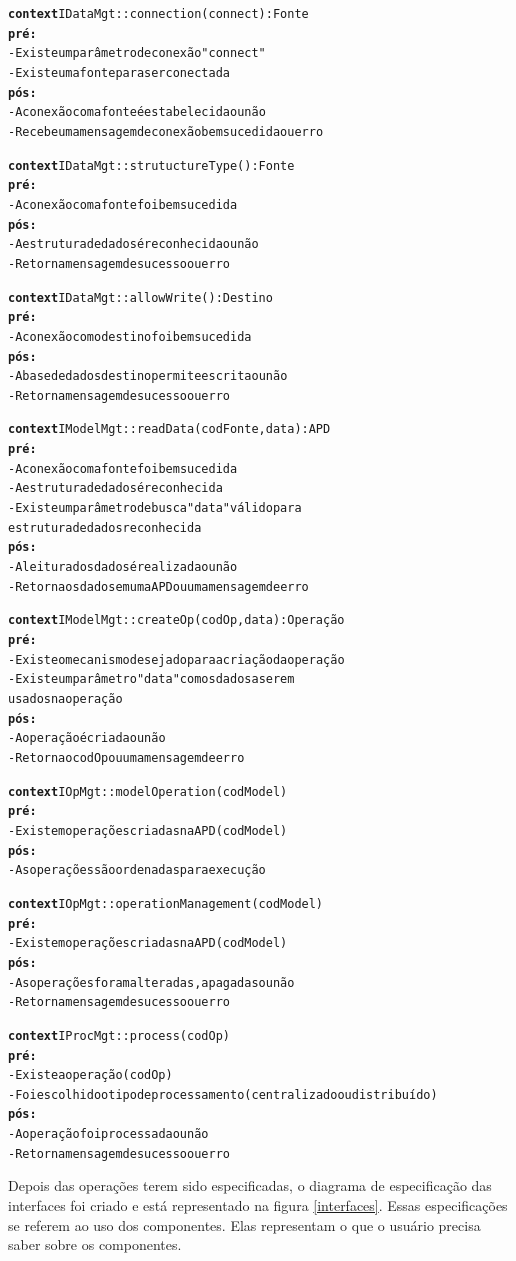 \begin{alltt}
	
	\textbf{context} IDataMgt :: connection(connect):Fonte
		\textbf{pré:}
		- Existe um parâmetro de conexão "connect"
		- Existe uma fonte para ser conectada
		\textbf{pós:}
		- A conexão com a fonte é estabelecida ou não
		- Recebe uma mensagem de conexão bem sucedida ou erro

	\textbf{context} IDataMgt :: strutuctureType():Fonte
		\textbf{pré:}
		- A conexão com a fonte foi bem sucedida
		\textbf{pós:}
		- A estrutura de dados é reconhecida ou não
		- Retorna mensagem de sucesso ou erro
		
	\textbf{context} IDataMgt :: allowWrite():Destino
		\textbf{pré:}
		- A conexão com o destino foi bem sucedida
		\textbf{pós:}
		- A base de dados destino permite escrita ou não
		- Retorna mensagem de sucesso ou erro
	
	\textbf{context} IModelMgt :: readData(codFonte, data):APD
		\textbf{pré:}
		- A conexão com a fonte foi bem sucedida
		- A estrutura de dados é reconhecida
		- Existe um parâmetro de busca "data" válido para 
		estrutura de dados reconhecida
		\textbf{pós:}
		- A leitura dos dados é realizada ou não
		- Retorna os dados em uma APD ou uma mensagem de erro
		
	\textbf{context} IModelMgt :: createOp(codOp, data):Operação
		\textbf{pré:}
		- Existe o mecanismo desejado para a criação da operação
		- Existe um parâmetro "data" com os dados a serem 
		usados na operação
		\textbf{pós:}
		- A operação é criada ou não
		- Retorna o codOp ou uma mensagem de erro
		
	\textbf{context} IOpMgt :: modelOperation(codModel)
		\textbf{pré:}
		- Existem operações criadas na APD (codModel)
		\textbf{pós:}
		- As operações são ordenadas para execução
		
	\textbf{context} IOpMgt :: operationManagement(codModel)
		\textbf{pré:}
		- Existem operações criadas na APD (codModel)
		\textbf{pós:}
		- As operações foram alteradas, apagadas ou não
		- Retorna mensagem de sucesso ou erro
	
	\textbf{context} IProcMgt :: process(codOp)
		\textbf{pré:}
		- Existe a operação (codOp)
		- Foi escolhido o tipo de processamento (centralizado ou distribuído)
		\textbf{pós:}
		- A operação foi processada ou não
		- Retorna mensagem de sucesso ou erro
		
			
\end{alltt}

Depois das operações terem sido especificadas, o diagrama de especificação das interfaces foi criado e está representado na figura \ref{interfaces}. Essas especificações se referem ao uso dos componentes. Elas representam o que o usuário precisa saber sobre os componentes.


